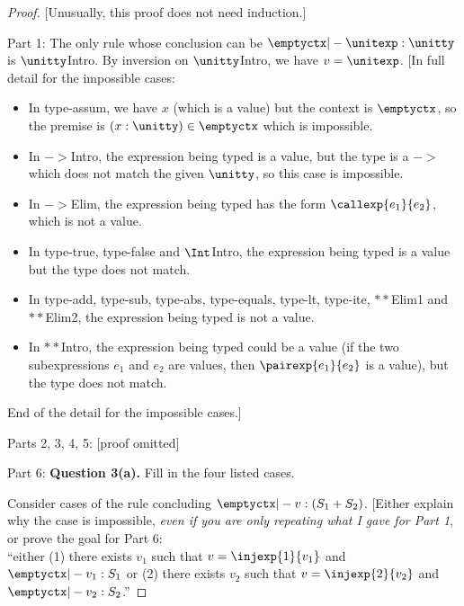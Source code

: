 \begin{proof}{}
  [Unusually, this proof does not need induction.]

  Part 1: The only rule whose conclusion can be $\emptyctx |- \unitexp : \unitty$
  is $\unitty$Intro.  By inversion on $\unitty$Intro, we have $v = \unitexp$.
  [In full detail for the impossible cases:
  
  \begin{itemize}
  \item In type-assum, we have $x$ (which is a value)
    but the context is $\emptyctx$, so the premise is $(x : \unitty) \in \emptyctx$
    which is impossible.

  \item In $->$Intro, the expression being typed is a value,
    but the type is a $->$ which does not match the given $\unitty$,
    so this case is impossible.

  \item In $->$Elim, the expression being typed has the form $\callexp{e_1}{e_2}$,
    which is not a value.

  \item In type-true, type-false and $\Int$Intro, the expression being typed
    is a value but the type does not match.

  \item In type-add, type-sub, type-abs, type-equals, type-lt, type-ite, $**$Elim1 and
    $**$Elim2, %
    the expression being typed is not a value.

  \item In $**$Intro, the expression being typed could be a value (if the
    two subexpressions $e_1$ and $e_2$ are values, then $\pairexp{e_1}{e_2}$
    is a value), but the type does not match.
  \end{itemize}
  End of the detail for the impossible cases.]

  \medskip

  Parts 2, 3, 4, 5: [proof omitted]

  \medskip

  Part 6: \textbf{Question 3(a).} Fill in the four listed cases.

  Consider cases of the rule concluding $\emptyctx |- v : (S_1 + S_2)$.
  [Either explain why the case is impossible, \emph{even if you are only
    repeating what I gave for Part 1}, or prove the goal for Part 6:\\
``either (1) there exists $v_1$ such that $v = \injexp{1}{v_1}$
    and $\emptyctx |- v_1 : S_1$
    or (2) there exists $v_2$ such that $v = \injexp{2}{v_2}$
    and $\emptyctx |- v_2 : S_2$.''


\end{proof}
